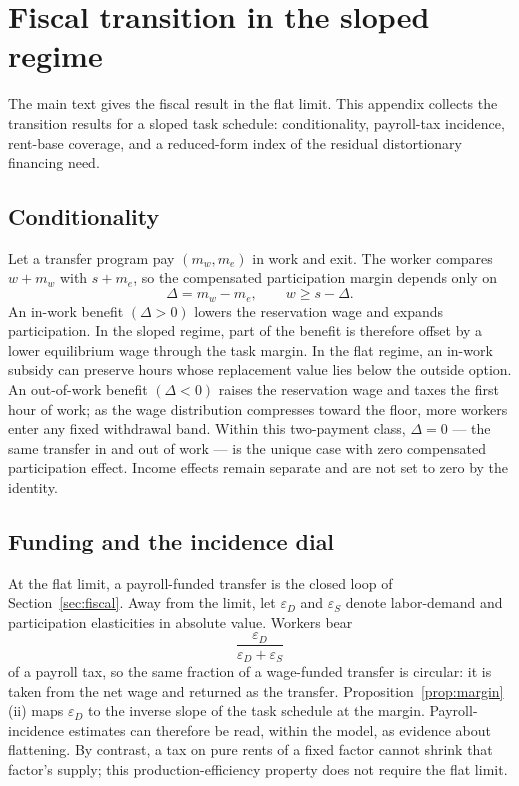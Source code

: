\documentclass[12pt]{article}
\theoremstyle{plain}
\begin{document}
\section{Fiscal transition in the sloped regime}\label{app:fiscal}

The main text gives the fiscal result in the flat limit. This appendix collects the transition results for a sloped task schedule: conditionality, payroll-tax incidence, rent-base coverage, and a reduced-form index of the residual distortionary financing need.

\subsection{Conditionality}\label{app:conditionality}

Let a transfer program pay $(m_w,m_e)$ in work and exit. The worker compares $w+m_w$ with $s+m_e$, so the compensated participation margin depends only on
\[
\Delta=m_w-m_e,
\qquad
w\ge s-\Delta.
\]
An in-work benefit $(\Delta>0)$ lowers the reservation wage and expands participation. In the sloped regime, part of the benefit is therefore offset by a lower equilibrium wage through the task margin. In the flat regime, an in-work subsidy can preserve hours whose replacement value lies below the outside option. An out-of-work benefit $(\Delta<0)$ raises the reservation wage and taxes the first hour of work; as the wage distribution compresses toward the floor, more workers enter any fixed withdrawal band. Within this two-payment class, $\Delta=0$ --- the same transfer in and out of work --- is the unique case with zero compensated participation effect. Income effects remain separate and are not set to zero by the identity.

\subsection{Funding and the incidence dial}\label{app:funding}

At the flat limit, a payroll-funded transfer is the closed loop of Section~\ref{sec:fiscal}. Away from the limit, let $\varepsilon_D$ and $\varepsilon_S$ denote labor-demand and participation elasticities in absolute value. Workers bear
\[
\frac{\varepsilon_D}{\varepsilon_D+\varepsilon_S}
\]
of a payroll tax, so the same fraction of a wage-funded transfer is circular: it is taken from the net wage and returned as the transfer. Proposition~\ref{prop:margin}(ii) maps $\varepsilon_D$ to the inverse slope of the task schedule at the margin. Payroll-incidence estimates can therefore be read, within the model, as evidence about flattening. By contrast, a tax on pure rents of a fixed factor cannot shrink that factor's supply; this production-efficiency property does not require the flat limit.
\end{document}
